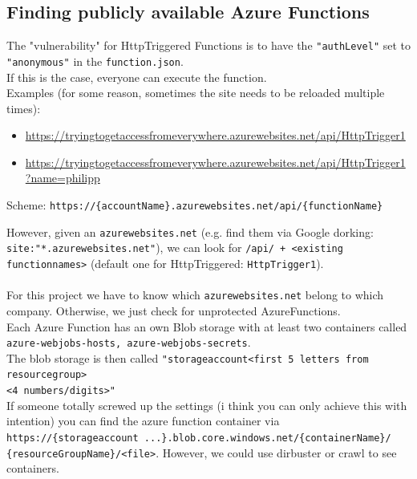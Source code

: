 \documentclass[12pt]{article}
\begin{document}
\subsection*{Finding publicly available Azure Functions}
The "vulnerability" for HttpTriggered Functions is to have the \verb|"authLevel"| set to \verb|"anonymous"| in the \verb|function.json|. \\
If this is the case, everyone can execute the function. \\
Examples (for some reason, sometimes the site needs to be reloaded multiple times):
\begin{itemize}
    \item \url{https://tryingtogetaccessfromeverywhere.azurewebsites.net/api/HttpTrigger1}
    \item \url{https://tryingtogetaccessfromeverywhere.azurewebsites.net/api/HttpTrigger1?name=philipp}
\end{itemize}
\begin{center}
    Scheme: \verb|https://{accountName}.azurewebsites.net/api/{functionName}|
\end{center}
However, given an \verb|azurewebsites.net| (e.g. find them via Google dorking: \\ \verb|site:"*.azurewebsites.net"|), we can look for \verb|/api/ + <existing functionnames>| (default one for HttpTriggered: \verb|HttpTrigger1|). \\ \\
For this project we have to know which \verb|azurewebsites.net| belong to which company. Otherwise, we just check for unprotected AzureFunctions. \\ 
Each Azure Function has an own Blob storage with at least two containers called \verb|azure-webjobs-hosts, azure-webjobs-secrets|. \\
The blob storage is then called \verb|"storageaccount<first 5 letters from resourcegroup>| \\ \verb|<4 numbers/digits>"| \\
If someone totally screwed up the settings (i think you can only achieve this with intention) you can find the azure function container via \\ \verb|https://{storageaccount ...}.blob.core.windows.net/{containerName}/| \\ \verb|{resourceGroupName}/<file>|. 
However, we could use dirbuster or crawl to see containers.


\end{document}
